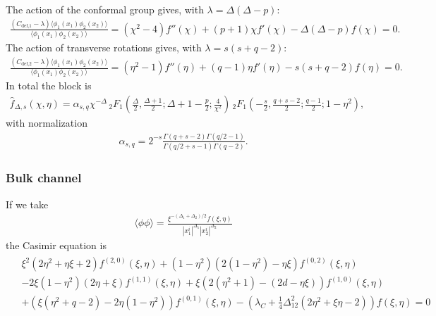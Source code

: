 \documentclass[letterpaper]{article}
\let\Oldsubsubsection\subsubsection
\renewcommand{\subsubsection}{\FloatBarrier\Oldsubsubsection}
\begin{document}
The action of the conformal group gives, with $\lambda = \Delta(\Delta-p)$:
\begin{align}
 \frac{(C_{\text{def,1}} - \lambda) \langle \phi_1(x_1) \phi_2(x_2) \rangle}
      {\langle \phi_1(x_1) \phi_2(x_2) \rangle}
 = (\chi^2 - 4) f''(\chi) + (p+1) \chi f'(\chi) - \Delta(\Delta-p) f(\chi)
 = 0.
\end{align}
The action of transverse rotations gives, with $\lambda = s(s + q - 2)$:
\begin{align}
 \frac{(C_{\text{def,2}} - \lambda) \langle \phi_1(x_1) \phi_2(x_2) \rangle}
      {\langle \phi_1(x_1) \phi_2(x_2) \rangle}
 = (\eta^2 - 1) f''(\eta) + (q-1) \eta f'(\eta) - s(s+q-2) f(\eta)
 = 0.
\end{align}
In total the block is
\begin{align}
 \hat f_{\Delta,s}(\chi,\eta) 
 = \alpha_{s,q} \chi ^{-\Delta } 
 \, _2F_1\left(\frac{\Delta }{2},\frac{\Delta +1}{2};\Delta+1-\frac{p}{2};\frac{4}{\chi ^2}\right)
 \, _2F_1\left(-\frac{s}{2},\frac{q+s-2}{2};\frac{q-1}{2};1-\eta ^2\right),
\end{align}
with normalization
\begin{align}
 \alpha_{s,q} = 2^{-s} \frac{\Gamma(q+s-2) \Gamma(q/2-1)}{\Gamma(q/2+s-1) \Gamma(q-2)}.
\end{align}


\subsubsection{Bulk channel}

If we take
\begin{align}
 \langle \phi \phi \rangle 
 = \frac{\xi^{-(\Delta_1 + \Delta_2)/2} f(\xi, \eta)}
        {|x_1^i|^{\Delta_1} |x_2^i|^{\Delta_2} }
\end{align}
the Casimir equation is
\begin{align}
\begin{split}
 & \xi ^2 \left(2 \eta ^2+\eta  \xi +2\right) f^{(2,0)}(\xi ,\eta ) 
 + \left(1-\eta ^2\right) \left(2 \left(1-\eta ^2\right)-\eta  \xi \right) f^{(0,2)}(\xi ,\eta ) \\
 & - 2 \xi \left(1-\eta ^2\right)  (2 \eta +\xi ) f^{(1,1)}(\xi ,\eta )
 + \xi  \left(2 \left(\eta ^2+1\right)-(2 d-\eta  \xi )\right) f^{(1,0)}(\xi ,\eta ) \\
 & + \left(\xi  \left(\eta ^2+q-2\right)-2 \eta  \left(1-\eta ^2\right)\right) f^{(0,1)}(\xi ,\eta )
 - \left(\lambda_C +\frac{1}{4} \Delta_{12}^2 \left(2 \eta^2 +\xi \eta - 2 \right)\right)f(\xi ,\eta )
 = 0
\end{split}
\end{align}
\end{document}

